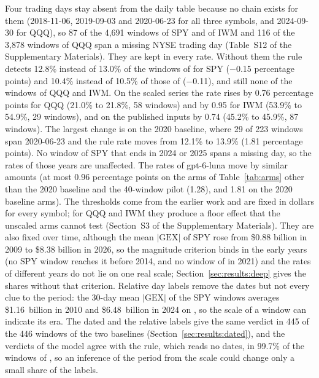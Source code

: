 Four trading days stay absent from the daily table because no chain exists for them (2018-11-06, 2019-09-03 and 2020-06-23 for all three symbols, and 2024-09-30 for QQQ), so 87 of the 4{,}691 windows of SPY and of IWM and 116 of the 3{,}878 windows of QQQ span a missing NYSE trading day (Table~S12 of the Supplementary Materials). They are kept in every rate. Without them the rule detects 12.8\% instead of 13.0\% of the windows of  for SPY ($-$0.15 percentage points) and 10.4\% instead of 10.5\% of those of  ($-$0.11), and still none of the windows of QQQ and IWM. On the scaled series the rate rises by 0.76 percentage points for QQQ (21.0\% to 21.8\%, 58 windows) and by 0.95 for IWM (53.9\% to 54.9\%, 29 windows), and on the published inputs by 0.74 (45.2\% to 45.9\%, 87 windows). The largest change is on the 2020 baseline, where 29 of 223 windows span 2020-06-23 and the rule rate moves from 12.1\% to 13.9\% (1.81 percentage points). No window of SPY that ends in 2024 or 2025 spans a missing day, so the rates of those years are unaffected. The rates of gpt-6-luna move by similar amounts (at most 0.96 percentage points on the arms of Table~\ref{tab:arms} other than the 2020 baseline and the 40-window pilot (1.28), and 1.81 on the 2020 baseline arms).
The thresholds come from the earlier work and are fixed in dollars for every symbol; for QQQ and IWM they produce a floor effect that the unscaled arms cannot test (Section~S3 of the Supplementary Materials). They are also fixed over time, although the mean $|\mathrm{GEX}|$ of SPY rose from \$0.88 billion in 2009 to \$8.38 billion in 2026, so the magnitude criterion binds in the early years (no SPY window reaches it before 2014, and no window of  in 2021) and the rates of different years do not lie on one real scale; Section~\ref{sec:results:deep} gives the shares without that criterion.
Relative day labels remove the dates but not every clue to the period: the 30-day mean $|\mathrm{GEX}|$ of the SPY windows averages \$1.16~billion in 2010 and \$6.48~billion in 2024 on , so the scale of a window can indicate its era. The dated and the relative labels give the same verdict in 445 of the 446 windows of the two baselines (Section~\ref{sec:results:dated}), and the verdicts of the model agree with the rule, which reads no dates, in 99.7\% of the windows of , so an inference of the period from the scale could change only a small share of the labels.
